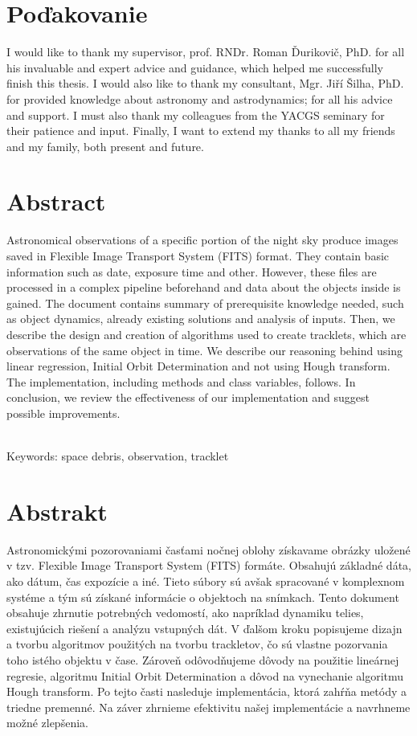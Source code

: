 \documentclass[12pt, a4paper, oneside]{book}
\begin{document}
\chapter*{Poďakovanie}\label{chap:thank_you}
I would like to thank my supervisor, prof. RNDr. Roman Ďurikovič, PhD. for all his invaluable and expert advice and guidance, which helped me successfully finish this thesis. I would also like to thank my consultant, Mgr. Jiří Šilha, PhD. for provided knowledge about astronomy and astrodynamics; for all his advice and support. I must also thank my colleagues from the YACGS seminary for their patience and input. Finally, I want to extend my thanks to all my friends and my family, both present and future.
\vfill\eject 

\chapter*{Abstract}\label{chap:abstract_en}
Astronomical observations of a specific portion of the night sky produce images saved in Flexible Image Transport System (FITS) format. They contain basic information such as date, exposure time and other. However, these files are processed in a complex pipeline beforehand and data about the objects inside is gained. The document contains summary of prerequisite knowledge needed, such as object dynamics, already existing solutions and analysis of inputs. Then, we describe the design and creation of algorithms used to create tracklets, which are observations of the same object in time. We describe our reasoning behind using linear regression, Initial Orbit Determination and not using Hough transform. The implementation, including methods and class variables, follows. In conclusion, we review the effectiveness of our implementation and suggest possible improvements.

~\\
Keywords: space debris, observation, tracklet
\vfill\eject 

\chapter*{Abstrakt}\label{chap:abstract_sk}
Astronomickými pozorovaniami časťami nočnej oblohy získavame obrázky uložené v tzv. Flexible Image Transport System (FITS) formáte. Obsahujú základné dáta, ako dátum, čas expozície a iné. Tieto súbory sú avšak spracované v komplexnom systéme a tým sú získané informácie o objektoch na snímkach. Tento dokument obsahuje zhrnutie potrebných vedomostí, ako napríklad dynamiku telies, existujúcich riešení a analýzu vstupných dát. V ďalšom kroku popisujeme dizajn a tvorbu algoritmov použitých na tvorbu trackletov, čo sú vlastne pozorvania toho istého objektu v čase. Zároveň odôvodňujeme dôvody na použitie lineárnej regresie, algoritmu Initial Orbit Determination a dôvod na vynechanie algoritmu Hough transform. Po tejto časti nasleduje implementácia, ktorá zahŕňa metódy a triedne premenné. Na záver zhrnieme efektivitu našej implementácie a navrhneme možné zlepšenia.
\end{document}

